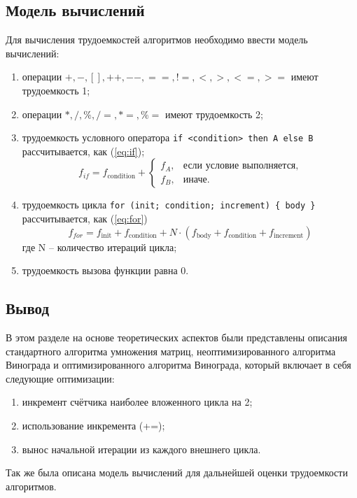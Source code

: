 \documentclass{article}
\begin{document}
\clearpage\subsection{Модель вычислений}
Для вычисления трудоемкостей алгоритмов необходимо ввести модель вычислений:
\begin{enumerate}
	\item операции $+, -, [], ++, {-}-, ==, !=, <, >, <=, >=$ имеют трудоемкость 1;
	\item операции $*, /, \%, /=,  *=, \%=$ имеют трудоемкость 2;
	\item трудоемкость условного оператора \texttt{if <condition> then A else B} рассчитывается, как (\ref{eq:if});
	\begin{equation}
		\label{eq:if}
		f_{if} = f_{\text{condition}} +
		\begin{cases}
			f_A, & \text{если условие выполняется,}\\
			f_B, & \text{иначе.}
		\end{cases}
	\end{equation}
	\item трудоемкость цикла \texttt{for (init; condition; increment) \{ body \}} рассчитывается, как (\ref{eq:for})
	\begin{equation}
		\label{eq:for}
		f_{for} = f_{\text{init}} + f_{\text{condition}} + N\cdot(f_{\text{body}} + f_{\text{condition}} + f_{\text{increment}})
	\end{equation}
	где N -- количество итераций цикла;
	\item трудоемкость вызова функции равна 0.
\end{enumerate}

\clearpage\subsection{Вывод}
В этом разделе на основе теоретических аспектов были представлены описания стандартного алгоритма умножения матриц,
неоптимизированного алгоритма Винограда и оптимизированного алгоритма Винограда, который включает в себя следующие 
оптимизации:
\begin{enumerate}
	\item инкремент счётчика наиболее вложенного цикла на 2; 
	\item использование инкремента (+=); 
	\item вынос начальной итерации из каждого внешнего цикла.
\end{enumerate}
Так же была описана модель вычислений для дальнейшей оценки трудоемкости алгоритмов.
\end{document}
